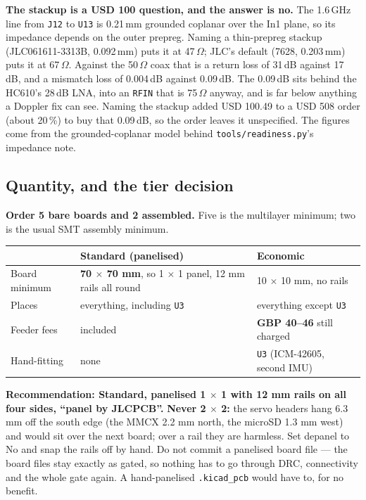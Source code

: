 \documentclass[11pt,a4paper]{article}
\newcommand{\file}[1]{\texttt{\small #1}}
\newcommand{\flag}[1]{\textcolor{warnred}{\textbf{#1}}}
\begin{document}
\textbf{The stackup is a USD 100 question, and the answer is no.} The 1.6\,GHz line from
\file{J12} to \file{U13} is 0.21\,mm grounded coplanar over the In1 plane, so its impedance
depends on the outer prepreg. Naming a thin-prepreg stackup (JLC061611-3313B, 0.092\,mm) puts it
at 47\,$\Omega$; JLC's default (7628, 0.203\,mm) puts it at 67\,$\Omega$. Against the
50\,$\Omega$ coax that is a return loss of 31\,dB against 17\,dB, and a mismatch loss of
0.004\,dB against 0.09\,dB. The 0.09\,dB sits behind the HC610's 28\,dB LNA, into an
\file{RFIN} that is 75\,$\Omega$ anyway, and is far below anything a Doppler fix can see.
Naming the stackup added USD 100.49 to a USD 508 order (about 20\,\%) to buy that 0.09\,dB, so
the order leaves it unspecified. The figures come from the grounded-coplanar model behind
\file{tools/readiness.py}'s impedance note.

\subsection{Quantity, and the tier decision}

\textbf{Order 5 bare boards and 2 assembled.} Five is the multilayer minimum; two is the
usual SMT assembly minimum.

\begin{center}
\begin{tabularx}{\textwidth}{@{}lXX@{}}
\toprule
 & \textbf{Standard (panelised)} & \textbf{Economic} \\
\midrule
Board minimum & \textbf{70 $\times$ 70 mm}, so 1 $\times$ 1 panel, 12 mm rails all round & 10 $\times$ 10 mm, no rails \\
Places & everything, including \file{U3} & everything except \file{U3} \\
Feeder fees & included & \textbf{GBP 40--46} still charged \\
Hand-fitting & none & \file{U3} (ICM-42605, second IMU) \\
\bottomrule
\end{tabularx}
\end{center}

\textbf{Recommendation: Standard, panelised 1 $\times$ 1 with 12 mm rails on all four sides, ``panel by JLCPCB''.} \flag{Never 2 $\times$ 2:} the servo headers hang 6.3 mm off the south edge (the MMCX 2.2 mm north, the microSD 1.3 mm west) and would sit over the next board; over a rail they are harmless. Set depanel to No and snap the rails off by hand. Do not
commit a panelised board file --- the board files stay exactly as gated, so nothing has to
go through DRC, connectivity and the whole gate again. A hand-panelised
\file{.kicad\_pcb} would have to, for no benefit.
\end{document}
